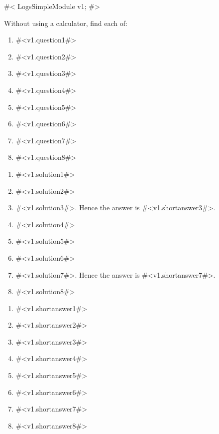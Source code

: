 



#<
LogsSimpleModule v1;
#>


Without using a calculator, find each of:
\begin{enumerate}
\item
#<v1.question1#> 
\item
#<v1.question2#> 
\item
#<v1.question3#> 
\item
#<v1.question4#> 
\item
#<v1.question5#>
\item
#<v1.question6#>
\item
#<v1.question7#>
\item
#<v1.question8#>

\end{enumerate}


\begin{enumerate}
\item
#<v1.solution1#> \\
\item
#<v1.solution2#> \\
\item
#<v1.solution3#>. Hence the answer is #<v1.shortanswer3#>. \\
\item
#<v1.solution4#> \\
\item
#<v1.solution5#>\\
\item
#<v1.solution6#> \\
\item
#<v1.solution7#>. Hence the answer is #<v1.shortanswer7#>. \\
\item
#<v1.solution8#> \\

\end{enumerate}

\begin{enumerate}
\item
#<v1.shortanswer1#>
\item
#<v1.shortanswer2#>
\item
#<v1.shortanswer3#>
\item
#<v1.shortanswer4#>
\item
#<v1.shortanswer5#>
\item
#<v1.shortanswer6#>
\item
#<v1.shortanswer7#>
\item
#<v1.shortanswer8#> 

\end{enumerate}



